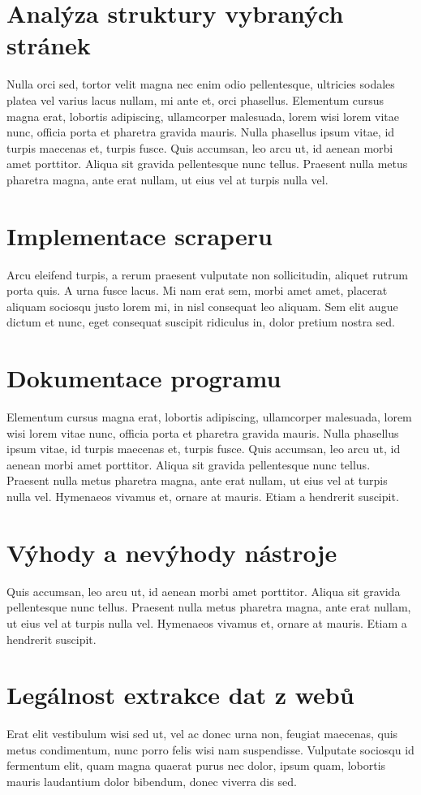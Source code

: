 \documentclass[11pt,a4paper]{article}
\begin{document}
\section{Analýza struktury vybraných stránek}
Nulla orci sed, tortor velit magna nec enim odio pellentesque, ultricies sodales platea vel varius lacus nullam, mi ante et, orci phasellus. Elementum cursus magna erat, lobortis adipiscing, ullamcorper malesuada, lorem wisi lorem vitae nunc, officia porta et pharetra gravida mauris. Nulla phasellus ipsum vitae, id turpis maecenas et, turpis fusce. Quis accumsan, leo arcu ut, id aenean morbi amet porttitor. Aliqua sit gravida pellentesque nunc tellus. Praesent nulla metus pharetra magna, ante erat nullam, ut eius vel at turpis nulla vel.

\section{Implementace scraperu}
Arcu eleifend turpis, a rerum praesent vulputate non sollicitudin, aliquet rutrum porta quis. A urna fusce lacus. Mi nam erat sem, morbi amet amet, placerat aliquam sociosqu justo lorem mi, in nisl consequat leo aliquam. Sem elit augue dictum et nunc, eget consequat suscipit ridiculus in, dolor pretium nostra sed.

\section{Dokumentace programu}
Elementum cursus magna erat, lobortis adipiscing, ullamcorper malesuada, lorem wisi lorem vitae nunc, officia porta et pharetra gravida mauris. Nulla phasellus ipsum vitae, id turpis maecenas et, turpis fusce. Quis accumsan, leo arcu ut, id aenean morbi amet porttitor. Aliqua sit gravida pellentesque nunc tellus. Praesent nulla metus pharetra magna, ante erat nullam, ut eius vel at turpis nulla vel. Hymenaeos vivamus et, ornare at mauris. Etiam a hendrerit suscipit.

\section{Výhody a nevýhody nástroje}
Quis accumsan, leo arcu ut, id aenean morbi amet porttitor. Aliqua sit gravida pellentesque nunc tellus. Praesent nulla metus pharetra magna, ante erat nullam, ut eius vel at turpis nulla vel. Hymenaeos vivamus et, ornare at mauris. Etiam a hendrerit suscipit.

\section{Legálnost extrakce dat z webů}
Erat elit vestibulum wisi sed ut, vel ac donec urna non, feugiat maecenas, quis metus condimentum, nunc porro felis wisi nam suspendisse. Vulputate sociosqu id fermentum elit, quam magna quaerat purus nec dolor, ipsum quam, lobortis mauris laudantium dolor bibendum, donec viverra dis sed.
\end{document}

